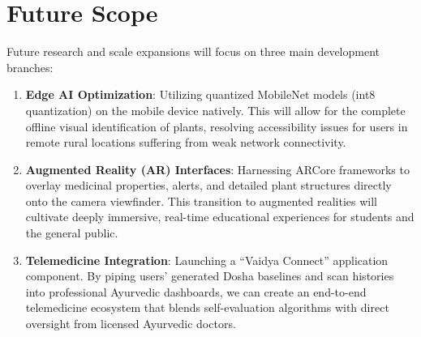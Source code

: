 \section{Future Scope}
Future research and scale expansions will focus on three main development branches:
\begin{enumerate}
    \item \textbf{Edge AI Optimization}: Utilizing quantized MobileNet models (int8 quantization) on the mobile device natively. This will allow for the complete offline visual identification of plants, resolving accessibility issues for users in remote rural locations suffering from weak network connectivity.
    \item \textbf{Augmented Reality (AR) Interfaces}: Harnessing ARCore frameworks to overlay medicinal properties, alerts, and detailed plant structures directly onto the camera viewfinder. This transition to augmented realities will cultivate deeply immersive, real-time educational experiences for students and the general public.
    \item \textbf{Telemedicine Integration}: Launching a ``Vaidya Connect'' application component. By piping users' generated Dosha baselines and scan histories into professional Ayurvedic dashboards, we can create an end-to-end telemedicine ecosystem that blends self-evaluation algorithms with direct oversight from licensed Ayurvedic doctors.
\end{enumerate}
